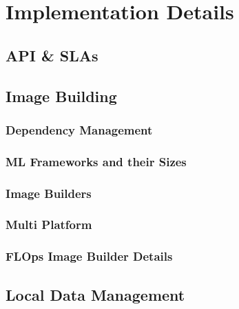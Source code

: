 \chapter{Implementation Details}

\section{API \& SLAs}

\section{Image Building}

    \subsection{Dependency Management}

    \subsection{ML Frameworks and their Sizes}

    \subsection{Image Builders}

    \subsection{Multi Platform}

    \subsection{FLOps Image Builder Details}

\section{Local Data Management}

